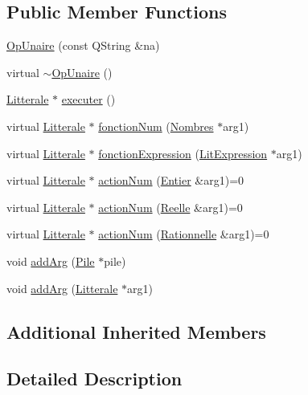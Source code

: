 \subsection*{Public Member Functions}
\begin{DoxyCompactItemize}
\item 
\hyperlink{class_op_unaire_ad13b6ddecf2d4be9311fa2e8acfe459b}{Op\+Unaire} (const Q\+String \&na)
\item 
virtual \hyperlink{class_op_unaire_a3ab73941cc8f0af333e4a8c321e8d3ce}{$\sim$\+Op\+Unaire} ()
\item 
\hyperlink{class_litterale}{Litterale} $\ast$ \hyperlink{class_op_unaire_a37fd2b7149554eb575280e88e8914ff6}{executer} ()
\item 
virtual \hyperlink{class_litterale}{Litterale} $\ast$ \hyperlink{class_op_unaire_a05586cb26efdcc8fa3aba5be681a71c8}{fonction\+Num} (\hyperlink{class_nombres}{Nombres} $\ast$arg1)
\item 
virtual \hyperlink{class_litterale}{Litterale} $\ast$ \hyperlink{class_op_unaire_aba2ca8e42f0fb230de466114eab02f62}{fonction\+Expression} (\hyperlink{class_lit_expression}{Lit\+Expression} $\ast$arg1)
\item 
virtual \hyperlink{class_litterale}{Litterale} $\ast$ \hyperlink{class_op_unaire_a4db1c0cbd6ec4acbe89a6ef2ae68f901}{action\+Num} (\hyperlink{class_entier}{Entier} \&arg1)=0
\item 
virtual \hyperlink{class_litterale}{Litterale} $\ast$ \hyperlink{class_op_unaire_a0b92d632cf248e765783f23d6d637d1f}{action\+Num} (\hyperlink{class_reelle}{Reelle} \&arg1)=0
\item 
virtual \hyperlink{class_litterale}{Litterale} $\ast$ \hyperlink{class_op_unaire_a7728e3d41bfe8ace1f9343a4cd404502}{action\+Num} (\hyperlink{class_rationnelle}{Rationnelle} \&arg1)=0
\item 
void \hyperlink{class_op_unaire_a180e3556bac104e4762b16dc23675afc}{add\+Arg} (\hyperlink{class_pile}{Pile} $\ast$pile)
\item 
void \hyperlink{class_op_unaire_a7bd766f9358b3d286a29a876ab82ebf6}{add\+Arg} (\hyperlink{class_litterale}{Litterale} $\ast$arg1)
\end{DoxyCompactItemize}
\subsection*{Additional Inherited Members}


\subsection{Detailed Description}


